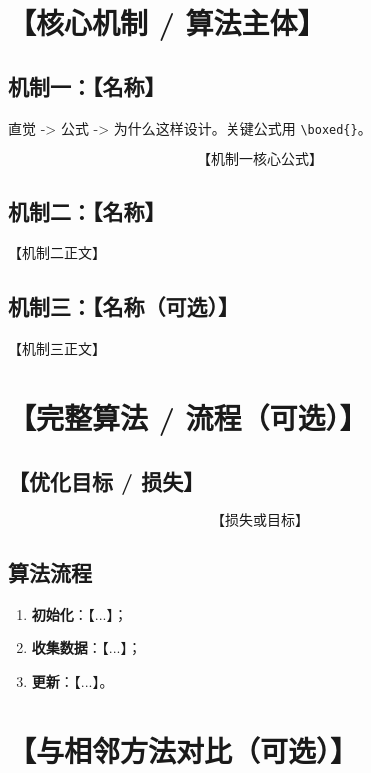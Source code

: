 \documentclass{article}
\begin{document}
\section*{【核心机制 / 算法主体】}

\subsection*{机制一：【名称】}

直觉 -> 公式 -> 为什么这样设计。关键公式用 \verb|\boxed{}|。

\[
\boxed{\text{【机制一核心公式】}}
\]

\subsection*{机制二：【名称】}

【机制二正文】

\subsection*{机制三：【名称（可选）】}

【机制三正文】

\section*{【完整算法 / 流程（可选）】}

\subsection*{【优化目标 / 损失】}

\[
\boxed{\text{【损失或目标】}}
\]

\subsection*{算法流程}

\begin{enumerate}
  \item \textbf{初始化}：【...】；
  \item \textbf{收集数据}：【...】；
  \item \textbf{更新}：【...】。
\end{enumerate}

\section*{【与相邻方法对比（可选）】}
\end{document}
